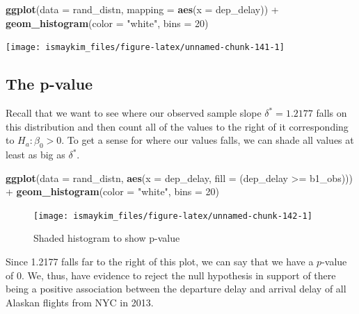 \documentclass[]{tufte-book}
\newenvironment{Shaded}{\begin{snugshade}}{\end{snugshade}}
\newcommand{\KeywordTok}[1]{\textcolor[rgb]{0.13,0.29,0.53}{\textbf{{#1}}}}
\newcommand{\DataTypeTok}[1]{\textcolor[rgb]{0.13,0.29,0.53}{{#1}}}
\newcommand{\DecValTok}[1]{\textcolor[rgb]{0.00,0.00,0.81}{{#1}}}
\newcommand{\StringTok}[1]{\textcolor[rgb]{0.31,0.60,0.02}{{#1}}}
\newcommand{\NormalTok}[1]{{#1}}
\begin{document}
\begin{Shaded}
\begin{Highlighting}[]
\KeywordTok{ggplot}\NormalTok{(}\DataTypeTok{data =} \NormalTok{rand_distn, }\DataTypeTok{mapping =} \KeywordTok{aes}\NormalTok{(}\DataTypeTok{x =} \NormalTok{dep_delay)) +}
\StringTok{  }\KeywordTok{geom_histogram}\NormalTok{(}\DataTypeTok{color =} \StringTok{"white"}\NormalTok{, }\DataTypeTok{bins =} \DecValTok{20}\NormalTok{)}
\end{Highlighting}
\end{Shaded}

\begin{center}\texttt{[image: ismaykim\_files/figure-latex/unnamed-chunk-141-1]} \end{center}

\subsection{The p-value}\label{the-p-value-2}

Recall that we want to see where our observed sample slope
\(\delta^* = 1.2177\) falls on this distribution and then count all of
the values to the right of it corresponding to \(H_a: \beta_0 > 0\). To
get a sense for where our values falls, we can shade all values at least
as big as \(\delta^*\).

\begin{Shaded}
\begin{Highlighting}[]
\KeywordTok{ggplot}\NormalTok{(}\DataTypeTok{data =} \NormalTok{rand_distn, }\KeywordTok{aes}\NormalTok{(}\DataTypeTok{x =} \NormalTok{dep_delay, }\DataTypeTok{fill =} \NormalTok{(dep_delay >=}\StringTok{ }\NormalTok{b1_obs))) +}
\StringTok{  }\KeywordTok{geom_histogram}\NormalTok{(}\DataTypeTok{color =} \StringTok{"white"}\NormalTok{, }\DataTypeTok{bins =} \DecValTok{20}\NormalTok{)}
\end{Highlighting}
\end{Shaded}

\begin{figure}

{\centering \texttt{[image: ismaykim\_files/figure-latex/unnamed-chunk-142-1]} 

}

\caption[Shaded histogram to show p-value]{Shaded histogram to show p-value}\label{fig:unnamed-chunk-142}
\end{figure}

Since 1.2177 falls far to the right of this plot, we can say that we
have a \(p\)-value of 0. We, thus, have evidence to reject the null
hypothesis in support of there being a positive association between the
departure delay and arrival delay of all Alaskan flights from NYC in
2013.
\end{document}
